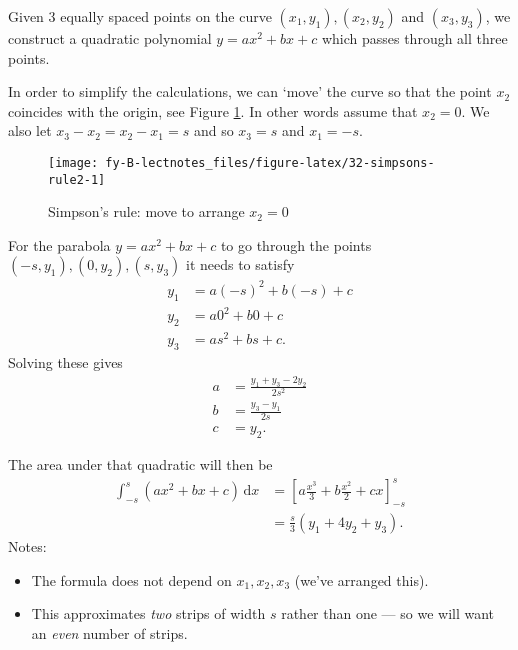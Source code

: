 \documentclass[
  english,
  11pt,
  oneside]{book}
\providecommand{\tightlist}{%
  \setlength{\itemsep}{0pt}\setlength{\parskip}{0pt}}
\newcommand{\slide}{}
\theoremstyle{definition}
\theoremstyle{definition}
\theoremstyle{definition}
\theoremstyle{definition}
\theoremstyle{remark}
\begin{document}
\slide

Given 3 equally spaced points on the curve \((x_1,y_1), (x_2, y_2)\) and \((x_3,y_3)\), we construct a quadratic polynomial \(y=ax^2+bx+c\) which passes through all three points.

In order to simplify the calculations, we can `move' the curve so that the point \(x_2\) coincides with the origin, see Figure \ref{fig:32-simpsons-rule2}. In other words assume that \(x_2=0\). We also let \(x_3-x_2=x_2-x_1=s\) and so \(x_3=s\) and \(x_1=-s\).

\begin{figure}

{\centering \texttt{[image: fy-B-lectnotes\_files/figure-latex/32-simpsons-rule2-1]} 

}

\caption{Simpson's rule: move to arrange $x_2=0$}\label{fig:32-simpsons-rule2}
\end{figure}

\slide

For the parabola \(y=ax^2+bx+c\) to go through the points \((-s,y_1),(0,y_2),(s,y_3)\) it needs to satisfy
\begin{align*}
y_1&=a(-s)^2+b(-s)+c\\
y_2&=a0^2+b0+c\\
y_3&=as^2+bs+c.
\end{align*}
Solving these gives
\begin{align*}
a&=\frac{y_1+y_3-2y_2}{2s^2}\\
b&=\frac{y_3-y_1}{2s}\\
c&=y_2.
\end{align*}
\slide
The area under that quadratic will then be
\begin{align*}
\int_{-s}^{s}(ax^2+bx+c)\,\mathrm{d}x &= \left[a\frac{x^3}3+b\frac{x^2}2+cx\right]_{-s}^{s}\\
&=\frac{s}{3}\left(y_1+4y_2+y_3\right).
\end{align*}
Notes:

\begin{itemize}
\tightlist
\item
  The formula does not depend on \(x_1,x_2,x_3\) (we've arranged this).
\item
  This approximates \emph{two} strips of width \(s\) rather than one --- so we will want an \emph{even} number of strips.
\end{itemize}

\slide
\end{document}
